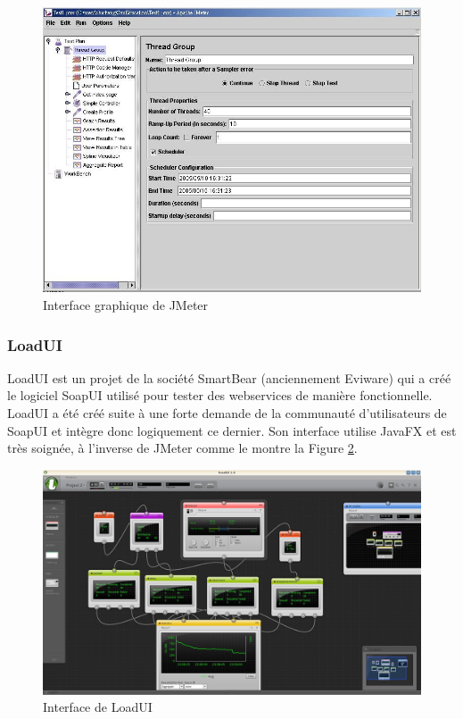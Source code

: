 \begin{figure}[ht]
\begin{center}
\includegraphics[width=400pt]{img/jmeter.jpg}
\end{center}
\caption{Interface graphique de JMeter}
\label{jmeter_scenario}
\end{figure}

\subsubsection{LoadUI}
LoadUI est un projet de la société SmartBear (anciennement Eviware) qui a créé le logiciel SoapUI utilisé pour tester des webservices de manière fonctionnelle. LoadUI a été créé suite à une forte demande de la communauté d'utilisateurs de SoapUI et intègre donc logiquement ce dernier. Son interface utilise JavaFX et est très soignée, à l'inverse de JMeter comme le montre la Figure \ref{loadui_ui}.

\begin{figure}[ht]
\begin{center}
\includegraphics[width=400pt]{img/loadui.jpg}
\end{center}
\caption{Interface de LoadUI}
\label{loadui_ui}
\end{figure}

